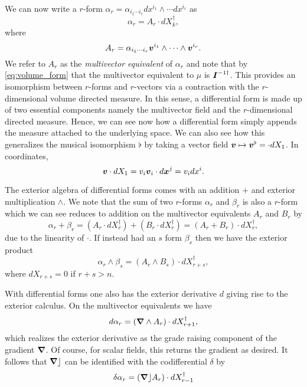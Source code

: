We can now write a $r$-form $\alpha_r = \alpha_{i_1 \cdots i_r} dx^{i_1}\wedge \cdots dx^{i_r}$ as 
\begin{equation}
\alpha_r = A_r \cdot dX_k^\dagger,
\end{equation}
where
\begin{equation}
A_r =  \alpha_{i_1 \cdots i_r} \boldsymbol{v}^{i_1} \wedge \cdots \wedge \boldsymbol{v}^{i_r}.
\end{equation}
We refer to $A_r$ as the \emph{multivector equivalent} of $\alpha_r$ and note that by \cref{eq:volume_form} that the multivector equivalent to $\mu$ is $\boldsymbol{I}^{-1 \dagger}$. This provides an isomorphism between $r$-forms and $r$-vectors via a contraction with the $r$-dimensional volume directed measure. In this sense, a differential form is made up of two essential components namely the multivector field and the $r$-dimensional directed measure. Hence, we can see now how a differential form simply appends the measure attached to the underlying space. We can also see how this generalizes the musical isomorphism $\flat$ by taking a vector field $\boldsymbol{v} \mapsto \boldsymbol{v}^\flat = \cdot dX_1$. In coordinates,
\begin{equation}
\label{eq:line_element}
 \boldsymbol{v} \cdot dX_1 = v_i  \boldsymbol{v}_i \cdot d\boldsymbol{x}^j = v_i dx^i.
\end{equation}

The exterior algebra of differential forms comes with an addition $+$ and exterior multiplication $\wedge$.  We note that the sum of two $r$-forms $\alpha_r$ and $\beta_r$ is also a $r$-form which we can see reduces to addition on the multivector equivalents $A_r$ and $B_r$ by
\begin{equation}
\alpha_r + \beta_r = (A_r \cdot dX_r^\dagger)+(B_r \cdot dX_r^\dagger) = (A_r + B_r) \cdot dX_r^\dagger,
\end{equation}
due to the linearity of $\cdot$.  If instead had an $s$ form $\beta_s$ then we have the exterior product
\begin{equation}
\alpha_r \wedge \beta_s = (A_r \wedge B_s) \cdot dX_{r+s}^\dagger,
\end{equation}
where $dX_{r+s}=0$ if $r+s>n$.  

With differential forms one also has the exterior derivative $d$ giving rise to the exterior calculus. On the multivector equivalents we have
\begin{equation}
d \alpha_r = (\boldsymbol{\nabla} \wedge A_r) \cdot dX_{r+1}^\dagger,
\end{equation}
which realizes the exterior derivative as the grade raising component of the gradient $\boldsymbol{\nabla}$. Of course, for scalar fields, this returns the gradient as desired. It follows that $\boldsymbol{\nabla} \rfloor$ can be identified with the codifferential $\delta$ by
\begin{equation}
\delta \alpha_r = (\boldsymbol{\nabla} \rfloor A_r)\cdot dX_{r-1}^\dagger
\end{equation} 

